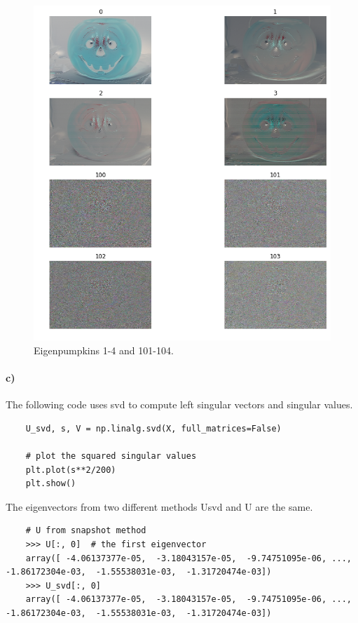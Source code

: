 \documentclass{article}
\begin{document}
	\begin{figure}[h!]
	\centering
	\includegraphics[width=\linewidth]{images/1_b_eigenpumpkin.png}
	\caption{Eigenpumpkins 1-4 and 101-104.}
	\label{fig:eig_pumpkin}
	\end{figure}
	
	
	\newpage
	\paragraph{c)} The following code uses svd to compute left singular vectors and singular values.
	\begin{lstlisting}
	U_svd, s, V = np.linalg.svd(X, full_matrices=False)
	
	# plot the squared singular values
	plt.plot(s**2/200)
	plt.show()
	\end{lstlisting}
		
	
	The eigenvectors from two different methods U\textunderscore svd and U are the same. 
	\begin{lstlisting}
	# U from snapshot method
	>>> U[:, 0]  # the first eigenvector
	array([ -4.06137377e-05,  -3.18043157e-05,  -9.74751095e-06, ..., -1.86172304e-03,  -1.55538031e-03,  -1.31720474e-03])
	>>> U_svd[:, 0]
	array([ -4.06137377e-05,  -3.18043157e-05,  -9.74751095e-06, ..., -1.86172304e-03,  -1.55538031e-03,  -1.31720474e-03])
	\end{lstlisting}
	
\end{document}

